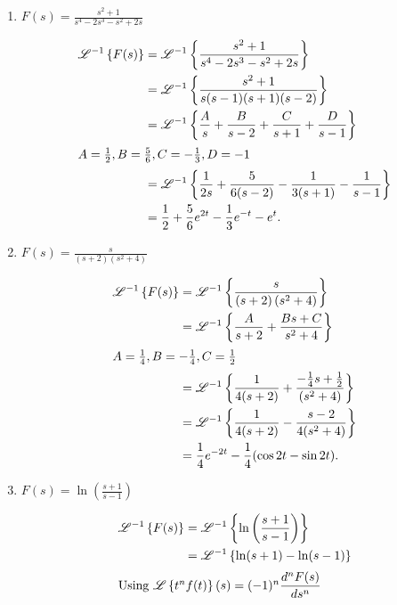 \documentclass{zc-ust-hw}
\renewcommand{\L}[1]{\mathscr{L}\left\{#1\right\}}
\newcommand{\Li}[1]{\mathscr{L}^{-1}\left\{#1\right\}}
\begin{document}
\begin{enumerate}
    \begin{enumerate}
      \item $F(s)=\frac{s^2+1}{s^4-2 s^3-s^2+2 s}$ \\
        \begin{sol}
          \begin{align}
            \Li{F(s)} &= \Li{\frac{s^2+1}{s^4-2 s^3-s^2+2 s}} \\
                      &= \Li{\frac{s^2+1}{s(s-1)(s+1)(s-2)}} \\
                      &= \Li{\frac{A}{s}+\frac{B}{s-2}+\frac{C}{s+1}+\frac{D}{s-1}} \\
                  \intertext{\( A=\frac{1}{2},B=\frac{5}{6},C=-\frac{1}{3},D=-1 \)}
                      &= \Li{\frac{1}{2s}+\frac{5}{6(s-2)}-\frac{1}{3(s+1)}-\frac{1}{s-1}} \\
                      &= \frac{1}{2}+\frac{5}{6}e^{2t}-\frac{1}{3}e^{-t}-e^{t} 
          .\end{align}
        \end{sol}
        \newpage
      \item $F(s)=\frac{s}{(s+2)\left(s^2+4\right)}$ \\
        \begin{sol}
          \begin{align}
            \Li{F(s)} &= \Li{\frac{s}{(s+2)\left(s^2+4\right)}} \\
                      &= \Li{\frac{A}{s+2}+\frac{Bs+C}{s^2+4}} \\
                      \intertext{\( A=\frac{1}{4},B=-\frac{1}{4},C=\frac{1}{2} \)}
                      &= \Li{\frac{1}{4(s+2)}+\frac{-\frac{1}{4}s+\frac{1}{2}}{(s^2+4)}} \\
                      &= \Li{\frac{1}{4(s+2)}-\frac{s-2}{4(s^2+4)}} \\
                      &= \frac{1}{4}e^{-2t}-\frac{1}{4}(\cos 2t - \sin 2t)
          .\end{align}
        \end{sol}
      \item $F(s)=\ln \left(\frac{s+1}{s-1}\right)$
        \begin{sol}
          \begin{align}
            \Li{F(s)} &= \Li{\ln \left(\frac{s+1}{s-1}\right)} \\
                      &= \Li{\ln (s+1)-\ln (s-1)} \\
                      \intertext{Using \( \L{t^{n}
                      f(t)}(s)=(-1)^{n}\dfrac{d^{n}F(s) }{ds^{n} } \)}

\end{align}
\end{sol}
\end{enumerate}
\end{enumerate}
\end{document}
